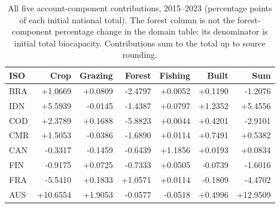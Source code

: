 \documentclass[11pt,a4paper]{article}
\begin{document}
\begin{table}[htbp]
\centering\small
\caption{All five account-component contributions, 2015--2023 (percentage points of each initial national total). The forest column is not the forest-component percentage change in the domain table: its denominator is initial total biocapacity. Contributions sum to the total up to source rounding.}\label{tab:SI_component_contributions}
\begin{tabularx}{\textwidth}{lrrrrrr}\toprule
ISO & Crop & Grazing & Forest & Fishing & Built & Sum\\\midrule
BRA & +1.0669 & +0.0809 & -2.4797 & +0.0052 & +0.1190 & -1.2076\\
IDN & +5.5939 & -0.0145 & -1.4387 & +0.0797 & +1.2352 & +5.4556\\
COD & +2.3789 & +0.1688 & -5.8823 & +0.0044 & +0.4201 & -2.9101\\
CMR & +1.5053 & -0.0386 & -1.6890 & +0.0114 & +0.7491 & +0.5382\\
CAN & -0.3317 & -0.1459 & -0.6439 & +1.1856 & +0.0193 & +0.0834\\
FIN & -0.9175 & +0.0725 & -0.7333 & +0.0505 & -0.0739 & -1.6016\\
FRA & -5.5410 & +0.1833 & +1.0571 & +0.0114 & -0.1809 & -4.4702\\
AUS & +10.6554 & +1.9053 & -0.0577 & -0.0518 & +0.4996 & +12.9509\\
\bottomrule\end{tabularx}
\end{table}
\end{document}
